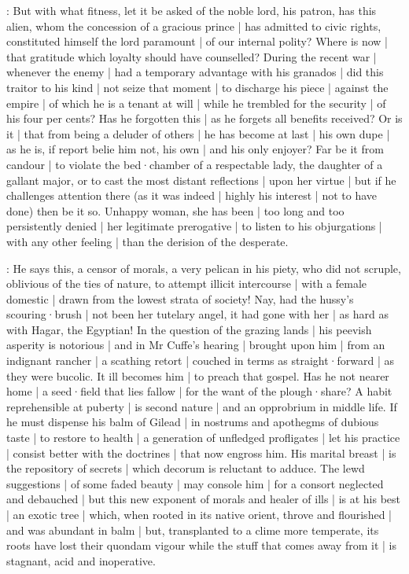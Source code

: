 \begin{omitted}


:
But with what fitness,
let it be asked of the noble lord,
his patron,
has this alien,
whom the concession of a gracious prince |
has admitted to civic rights,
constituted himself the lord paramount |
of our internal polity?
Where is now |
that gratitude which loyalty should have counselled?
During the recent war |
whenever the enemy |
had a temporary advantage with his granados |
did this traitor to his kind |
not seize that moment |
to discharge his piece |
against the empire |
of which he is a tenant at will |
while he trembled for the security |
of his four per cents?
Has he forgotten this |
as he forgets all benefits received?
Or is it |
that from being a deluder of others |
he has become at last |
his own dupe |
as he is,
if report belie him not,
his own |
and his only enjoyer?
Far be it from candour |
to violate the bed·chamber of a respectable lady,
the daughter of a gallant major,
or to cast the most distant reflections |
upon her virtue |
but if he challenges attention there
(as it was indeed |
highly his interest |
not to have done)
then be it so.
Unhappy woman,
she has been |
too long and too persistently denied |
her legitimate prerogative |
to listen to his objurgations |
with any other feeling |
than the derision of the desperate.

:
He says this,
a censor of morals,
a very pelican in his piety,
who did not scruple,
oblivious of the ties of nature,
to attempt illicit intercourse |
with a female domestic |
drawn from the lowest strata of society!
Nay,
had the hussy's scouring·brush |
not been her tutelary angel,
it had gone with her |
as hard as with Hagar,
the Egyptian!
In the question of the grazing lands |
his peevish asperity is notorious |
and in Mr Cuffe's hearing |
brought upon him |
from an indignant rancher |
a scathing retort |
couched in terms as straight·forward |
as they were bucolic.
It ill becomes him |
to preach that gospel.
Has he not nearer home |
a seed·field that lies fallow |
for the want of the plough·share?
A habit reprehensible at puberty |
is second nature |
and an opprobrium in middle life.
If he must dispense his balm of Gilead |
in nostrums and apothegms of dubious taste |
to restore to health |
a generation of unfledged profligates |
let his practice |
consist better with the doctrines |
that now engross him.
His marital breast |
is the repository of secrets |
which decorum is reluctant to adduce.
The lewd suggestions |
of some faded beauty |
may console him |
for a consort neglected and debauched |
but this new exponent of morals and healer of ills |
is at his best |
an exotic tree |
which,
when rooted in its native orient,
throve and flourished |
and was abundant in balm |
but,
transplanted to a clime more temperate,
its roots have lost their quondam vigour
while the stuff that comes away from it |
is stagnant,
acid and inoperative.
\end{omitted}

